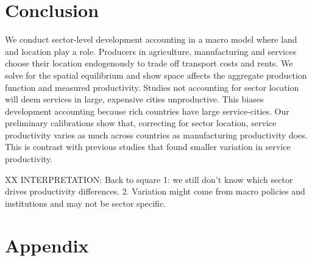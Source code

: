 \documentclass[12pt]{article}
\begin{document}
\section{Conclusion}
We conduct sector-level development accounting in a macro model where land and location play a role. Producers in agriculture, manufacturing and services choose their location endogenously to trade off transport costs and rents. We solve for the spatial equilibrium and show space affects the aggregate production function and measured productivity. Studies not accounting for sector location will deem services in large, expensive cities unproductive. This biases development accounting because rich countries have large service-cities. Our preliminary calibrations show that, correcting for sector location, service productivity varies as much across countries as manufacturing productivity does. This is contrast with previous studies that found smaller variation in service productivity.

XX INTERPRETATION: Back to square 1: we still don’t know which sector drives productivity differences.
2. Variation might come from macro policies and institutions and may not be sector specific.

\clearpage





\clearpage

\section{Appendix}
\end{document}
